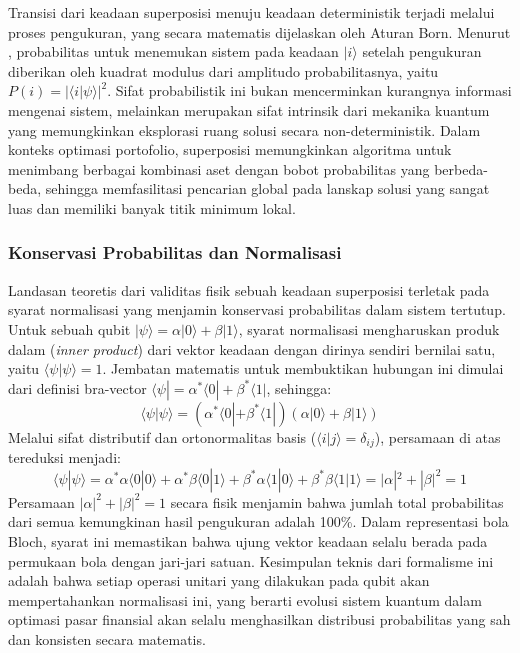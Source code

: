 Transisi dari keadaan superposisi menuju keadaan deterministik terjadi melalui proses pengukuran, yang secara matematis dijelaskan oleh Aturan Born. Menurut \cite{preskill_2018}, probabilitas untuk menemukan sistem pada keadaan $|i\rangle$ setelah pengukuran diberikan oleh kuadrat modulus dari amplitudo probabilitasnya, yaitu $P(i) = |\langle i | \psi \rangle|^2$. Sifat probabilistik ini bukan mencerminkan kurangnya informasi mengenai sistem, melainkan merupakan sifat intrinsik dari mekanika kuantum yang memungkinkan eksplorasi ruang solusi secara non-deterministik. Dalam konteks optimasi portofolio, superposisi memungkinkan algoritma untuk menimbang berbagai kombinasi aset dengan bobot probabilitas yang berbeda-beda, sehingga memfasilitasi pencarian global pada lanskap solusi yang sangat luas dan memiliki banyak titik minimum lokal.

\subsubsection{Konservasi Probabilitas dan Normalisasi}

Landasan teoretis dari validitas fisik sebuah keadaan superposisi terletak pada syarat normalisasi yang menjamin konservasi probabilitas dalam sistem tertutup. Untuk sebuah qubit $|\psi\rangle = \alpha|0\rangle + \beta|1\rangle$, syarat normalisasi mengharuskan produk dalam (\textit{inner product}) dari vektor keadaan dengan dirinya sendiri bernilai satu, yaitu $\langle \psi | \psi \rangle = 1$. Jembatan matematis untuk membuktikan hubungan ini dimulai dari definisi bra-vector $\langle \psi | = \alpha^*\langle 0 | + \beta^*\langle 1 |$, sehingga:
\begin{equation}
    \langle \psi | \psi \rangle = (\alpha^*\langle 0 | + \beta^*\langle 1 |)(\alpha|0\rangle + \beta|1\rangle)
\end{equation}
Melalui sifat distributif dan ortonormalitas basis ($\langle i | j \rangle = \delta_{ij}$), persamaan di atas tereduksi menjadi:
\begin{equation}
    \langle \psi | \psi \rangle = \alpha^*\alpha\langle 0 | 0 \rangle + \alpha^*\beta\langle 0 | 1 \rangle + \beta^*\alpha\langle 1 | 0 \rangle + \beta^*\beta\langle 1 | 1 \rangle = |\alpha|^2 + |\beta|^2 = 1
\end{equation}
Persamaan $|\alpha|^2 + |\beta|^2 = 1$ secara fisik menjamin bahwa jumlah total probabilitas dari semua kemungkinan hasil pengukuran adalah 100\%. Dalam representasi bola Bloch, syarat ini memastikan bahwa ujung vektor keadaan selalu berada pada permukaan bola dengan jari-jari satuan. Kesimpulan teknis dari formalisme ini adalah bahwa setiap operasi unitari yang dilakukan pada qubit akan mempertahankan normalisasi ini, yang berarti evolusi sistem kuantum dalam optimasi pasar finansial akan selalu menghasilkan distribusi probabilitas yang sah dan konsisten secara matematis.

